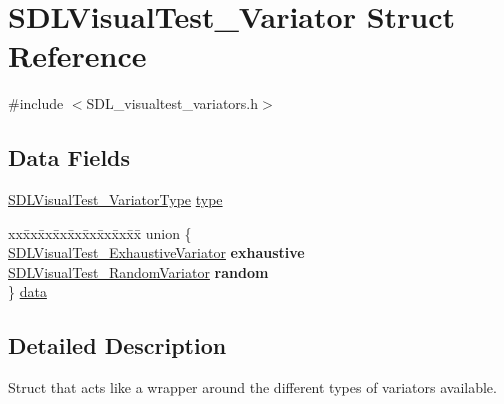 \hypertarget{struct_s_d_l_visual_test___variator}{\section{S\-D\-L\-Visual\-Test\-\_\-\-Variator Struct Reference}
\label{struct_s_d_l_visual_test___variator}
}


{\ttfamily \#include $<$S\-D\-L\-\_\-visualtest\-\_\-variators.\-h$>$}

\subsection*{Data Fields}
\begin{DoxyCompactItemize}
\item 
\hyperlink{_s_d_l__visualtest__variator__common_8h_a04bfc880abe6940d69a63c06a33acdbd}{S\-D\-L\-Visual\-Test\-\_\-\-Variator\-Type} \hyperlink{struct_s_d_l_visual_test___variator_a24d4399dc1877c1843e120e7b027ae64}{type}
\item 
\begin{tabbing}
xx\=xx\=xx\=xx\=xx\=xx\=xx\=xx\=xx\=\kill
union \{\\
\>\hyperlink{struct_s_d_l_visual_test___exhaustive_variator}{SDLVisualTest\_ExhaustiveVariator} {\bfseries exhaustive}\\
\>\hyperlink{struct_s_d_l_visual_test___random_variator}{SDLVisualTest\_RandomVariator} {\bfseries random}\\
\} \hyperlink{struct_s_d_l_visual_test___variator_af99a8790e729d599c656a2070e672e9a}{data}\\

\end{tabbing}\end{DoxyCompactItemize}


\subsection{Detailed Description}
Struct that acts like a wrapper around the different types of variators available. 

